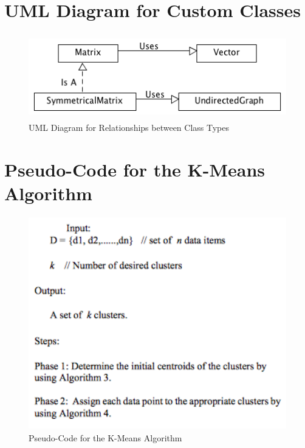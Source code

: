 \documentclass[12pt]{article}
\begin{document}
\section{UML Diagram for Custom Classes}
\label{appendix:uml}
\begin{figure}[!htb]
\begin{center}
	\includegraphics[height=10em]{uml.png}
	\caption{UML Diagram for Relationships between Class Types}
\end{center}
\end{figure}

\newpage
\section{Pseudo-Code for the K-Means Algorithm}
\label{appendix:kmeans}
\begin{figure}[!htb]
\begin{center}
	\includegraphics[height=25em]{kmeans.png}
	\caption{Pseudo-Code for the K-Means Algorithm}
\end{center}
\end{figure}

\newpage
\end{document}
